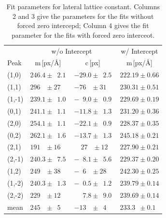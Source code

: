 \documentclass[a4paper,10pt]{scrartcl}
\begin{document}
\begin{table}
\begin{center}
\begin{tabular}{lccc}
\toprule
       & \multicolumn{2}{c}{w/o Intercept}                                                     & w/ Intercept      \\
\cmidrule(r){2-4}
Peak   & m\,[px/\AA]                          & c\,[px]                                        & m\,[px/\AA]       \\
\midrule
(1,0)  & $246.4 \pm \phantom{0}2.1$           & $-29.0 \pm \phantom{0}2.5$                     & $222.19 \pm 0.66$ \\ 
(1,1)  & $296\phantom{.0} \pm 27\phantom{.0}$ & $-76\phantom{.0} \pm 31\phantom{.0}$           & $230.31 \pm 0.51$ \\ 
(1,-1) & $239.1 \pm \phantom{0}1.0$           & $-\phantom{0}9.0 \pm \phantom{0}0.9$           & $229.69 \pm 0.19$ \\ 
(0,1)  & $241.1 \pm \phantom{0}1.1$           & $-11.8 \pm \phantom{0}1.3$                     & $231.20 \pm 0.36$ \\ 
(2,0)  & $254.1 \pm \phantom{0}1.1$           & $-22.1 \pm \phantom{0}0.9$                     & $228.37 \pm 0.35$ \\ 
(0,2)  & $262.1 \pm \phantom{0}1.6$           & $-13.7 \pm \phantom{0}1.3$                     & $245.18 \pm 0.21$ \\ 
(2,1)  & $191\phantom{.0} \pm 16\phantom{.0}$ & $\phantom{-}27\phantom{.0} \pm 12\phantom{.0}$ & $227.90 \pm 0.21$ \\ 
(2,-1) & $240.3 \pm \phantom{0}7.5$           & $-\phantom{0}8.1 \pm \phantom{0}5.6$           & $229.37 \pm 0.20$ \\ 
(1,2)  & $249\phantom{.0} \pm 38\phantom{.0}$ & $-\phantom{0}6\phantom{.0} \pm 28\phantom{.0}$ & $242.30 \pm 0.25$ \\ 
(1,-2) & $240.3 \pm \phantom{0}1.3$           & $-\phantom{0}0.5 \pm \phantom{0}1.2$           & $239.79 \pm 0.14$ \\ 
(2,-2) & $229\phantom{.0} \pm 12\phantom{.0}$ & $\phantom{-0}7.8 \pm \phantom{0}9.0$           & $239.69 \pm 0.14$ \\ 
mean   & $245\phantom{.0} \pm \phantom{0}5\phantom{.0}$ & $-13\phantom{.0} \pm \phantom{0}4\phantom{.0}$ & $233.3\phantom{0} \pm 0.1\phantom{0}$ \\ 
\bottomrule
\end{tabular}
\end{center}
\par
\caption{Fit parameters for lateral lattice constant. Columns 2 and 3 give the parameters for the fits without forced zero intercepd; Column 4 gives the fit parameter for the fits with forced zero interceot.\label{tab:calibdata}}
\end{table}
\end{document}
